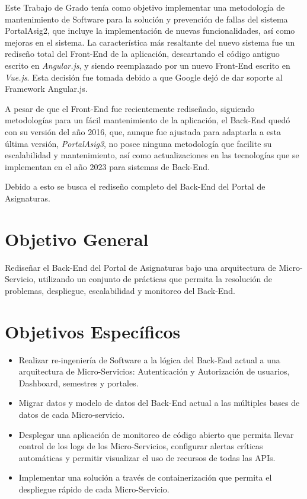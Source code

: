     Este Trabajo de Grado tenía como objetivo implementar una metodología de mantenimiento de Software para la solución y prevención de fallas del sistema PortalAsig2, que incluye la implementación de nuevas funcionalidades, así como mejoras en el sistema. La característica más resaltante del nuevo sistema fue un rediseño total del Front-End de la aplicación, descartando el código antiguo escrito en \textit{Angular.js}, y siendo reemplazado por un nuevo Front-End escrito en \textit{Vue.js}. Esta decisión fue tomada debido a que Google dejó de dar soporte al Framework Angular.js. 

    A pesar de que el Front-End fue recientemente rediseñado, siguiendo metodologías para un fácil mantenimiento de la aplicación, el Back-End quedó con su versión del año 2016, que, aunque fue ajustada para adaptarla a esta última versión, \textit{PortalAsig3}, no posee ninguna metodología que facilite su escalabilidad y mantenimiento, así como actualizaciones en las tecnologías que se implementan en el año 2023 para sistemas de Back-End.\cite{portalasig_3}
    
    Debido a esto se busca el rediseño completo del Back-End del Portal de Asignaturas.

    \section{Objetivo General}

    Rediseñar el Back-End del Portal de Asignaturas bajo una arquitectura de Micro-Servicio, utilizando un conjunto de prácticas que permita la resolución de problemas, despliegue, escalabilidad y monitoreo del Back-End.

    \section{Objetivos Específicos}
        
    \begin{itemize}
        \item Realizar re-ingeniería de Software a la lógica del Back-End actual a una arquitectura de Micro-Servicios: Autenticación y Autorización de usuarios, Dashboard, semestres y portales.
        \item Migrar datos y modelo de datos del Back-End actual a las múltiples bases de datos de cada Micro-servicio.
        \item Desplegar una aplicación de monitoreo de código abierto que permita llevar control de los logs de los Micro-Servicios, configurar alertas críticas automáticas y permitir visualizar el uso de recursos de todas las APIs.
        \item Implementar una solución a través de containerización que permita el despliegue rápido de cada Micro-Servicio.
    \end{itemize}
        
